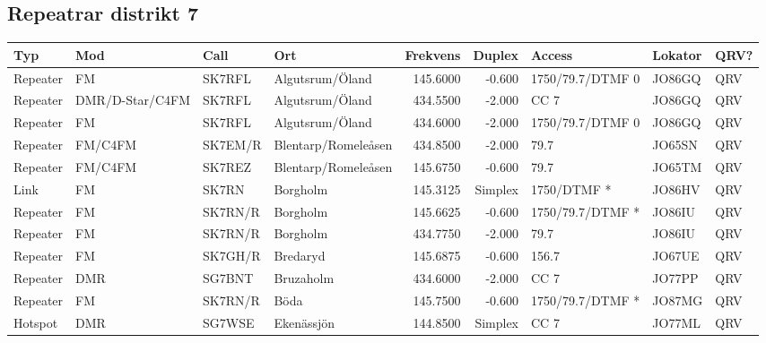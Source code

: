\begin{landscape}
\clearpage

\subsection{Repeatrar distrikt 7}

\begin{longtable}{llllrrlll}
	\bf Typ  & \bf Mod         & \bf Call & \bf Ort              & \bf Frekvens & \bf Duplex & \bf Access        & \bf Lokator & \bf QRV? \\ \hline
	\endhead
	Repeater & FM              & SK7RFL   & Algutsrum/Öland      &     145.6000 &     -0.600 & 1750/79.7/DTMF 0  & JO86GQ      & QRV      \\
	Repeater & DMR/D-Star/C4FM & SK7RFL   & Algutsrum/Öland      &     434.5500 &     -2.000 & CC 7              & JO86GQ      & QRV      \\
	Repeater & FM              & SK7RFL   & Algutsrum/Öland      &     434.6000 &     -2.000 & 1750/79.7/DTMF 0  & JO86GQ      & QRV      \\
	Repeater & FM/C4FM         & SK7EM/R  & Blentarp/Romeleåsen  &     434.8500 &     -2.000 & 79.7              & JO65SN      & QRV      \\
	Repeater & FM/C4FM         & SK7REZ   & Blentarp/Romeleåsen  &     145.6750 &     -0.600 & 79.7              & JO65TM      & QRV      \\
	Link     & FM              & SK7RN    & Borgholm             &     145.3125 &    Simplex & 1750/DTMF *       & JO86HV      & QRV      \\
	Repeater & FM              & SK7RN/R  & Borgholm             &     145.6625 &     -0.600 & 1750/79.7/DTMF *  & JO86IU      & QRV      \\
	Repeater & FM              & SK7RN/R  & Borgholm             &     434.7750 &     -2.000 & 79.7              & JO86IU      & QRV      \\
	Repeater & FM              & SK7GH/R  & Bredaryd             &     145.6875 &     -0.600 & 156.7             & JO67UE      & QRV      \\
	Repeater & DMR             & SG7BNT   & Bruzaholm            &     434.6000 &     -2.000 & CC 7              & JO77PP      & QRV      \\
	Repeater & FM              & SK7RN/R  & Böda                 &     145.7500 &     -0.600 & 1750/79.7/DTMF *  & JO87MG      & QRV      \\
	Hotspot  & DMR             & SG7WSE   & Ekenässjön           &     144.8500 &    Simplex & CC 7              & JO77ML      & QRV      \\

\end{longtable}
\end{landscape}
